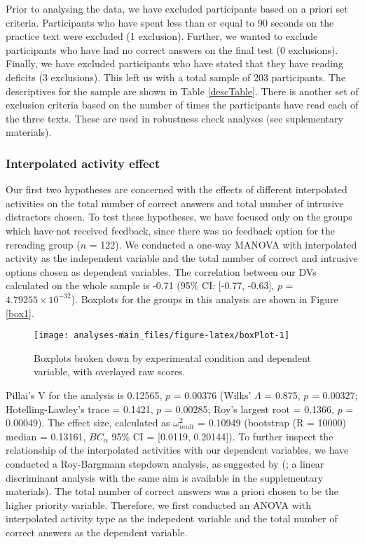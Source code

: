 \documentclass[11pt,]{article}
\begin{document}
Prior to analysing the data, we have excluded participants based on a
priori set criteria. Participants who have spent less than or equal to
90 seconds on the practice text were excluded (1 exclusion). Further, we
wanted to exclude participants who have had no correct answers on the
final test (0 exclusions). Finally, we have excluded participants who
have stated that they have reading deficits (3 exclusions). This left us
with a total sample of 203 participants. The descriptives for the sample
are shown in Table \ref{descTable}. There is another set of exclusion
criteria based on the number of times the participants have read each of
the three texts. These are used in robustness check analyses (see
suplementary materials).

\hypertarget{interpolated-activity-effect}{%
\subsubsection{Interpolated activity
effect}\label{interpolated-activity-effect}}

Our first two hypotheses are concerned with the effects of different
interpolated activities on the total number of correct answers and total
number of intrusive distractors chosen. To test these hypotheses, we
have focused only on the groups which have not received feedback, since
there was no feedback option for the rereading group (\(n\) = 122). We
conducted a one-way MANOVA with interpolated activity as the independent
variable and the total number of correct and intrusive options chosen as
dependent variables. The correlation between our DVs calculated on the
whole sample is -0.71 (95\% CI: {[}-0.77, -0.63{]}, \(p\) =
\(4.79255\times 10^{-32}\)). Boxplots for the groups in this analysis
are shown in Figure \ref{box1}.

\begin{figure*}[h]

{\centering \texttt{[image: analyses-main\_files/figure-latex/boxPlot-1]} 

}

\caption{\label{box1} Boxplots broken down by experimental condition and dependent variable, with overlayed raw scores.}\label{fig:boxPlot}
\end{figure*}

Pillai's V for the analysis is 0.12565, \(p\) = 0.00376 (Wilks'
\(\Lambda\) = 0.875, \(p\) = 0.00327; Hotelling-Lawley's trace = 0.1421,
\(p\) = 0.00285; Roy's largest root = 0.1366, \(p\) = 0.00049). The
effect size, calculated as \(\omega^2_{mult}\) = 0.10949 (bootstrap (R =
10000) median = 0.13161, \(BC_\alpha\) 95\% CI = {[}0.0119, 0.20144{]}).
To further inspect the relationship of the interpolated activities with
our dependent variables, we have conducted a Roy-Bargmann stepdown
analysis, as suggested by \citeauthor{tabachnick_using_2012}
(\citeyear{tabachnick_using_2012}; a linear discriminant analysis with
the same aim is available in the supplementary materials). The total
number of correct answers was a priori chosen to be the higher priority
variable. Therefore, we first conducted an ANOVA with interpolated
activity type as the indepedent variable and the total number of correct
answers as the dependent variable.
\end{document}
